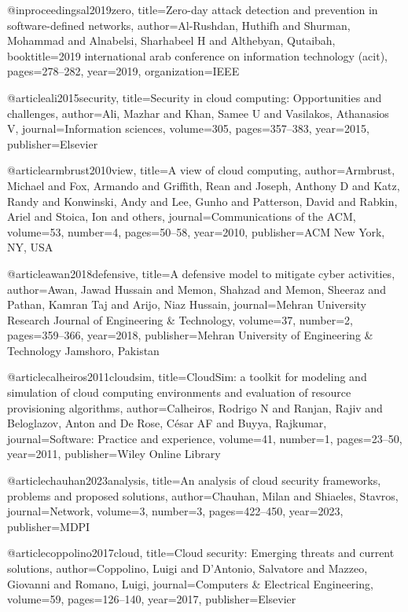@inproceedings{al2019zero,
title={Zero-day attack detection and prevention in software-defined networks},
author={Al-Rushdan, Huthifh and Shurman, Mohammad and Alnabelsi, Sharhabeel H and Althebyan, Qutaibah},
booktitle={2019 international arab conference on information technology (acit)},
pages={278--282},
year={2019},
organization={IEEE}
}

@article{ali2015security,
title={Security in cloud computing: Opportunities and challenges},
author={Ali, Mazhar and Khan, Samee U and Vasilakos, Athanasios V},
journal={Information sciences},
volume={305},
pages={357--383},
year={2015},
publisher={Elsevier}
}

@article{armbrust2010view,
title={A view of cloud computing},
author={Armbrust, Michael and Fox, Armando and Griffith, Rean and Joseph, Anthony D and Katz, Randy and Konwinski, Andy and Lee, Gunho and Patterson, David and Rabkin, Ariel and Stoica, Ion and others},
journal={Communications of the ACM},
volume={53},
number={4},
pages={50--58},
year={2010},
publisher={ACM New York, NY, USA}
}

@article{awan2018defensive,
title={A defensive model to mitigate cyber activities},
author={Awan, Jawad Hussain and Memon, Shahzad and Memon, Sheeraz and Pathan, Kamran Taj and Arijo, Niaz Hussain},
journal={Mehran University Research Journal of Engineering \& Technology},
volume={37},
number={2},
pages={359--366},
year={2018},
publisher={Mehran University of Engineering \& Technology Jamshoro, Pakistan}
}

@article{calheiros2011cloudsim,
title={CloudSim: a toolkit for modeling and simulation of cloud computing environments and evaluation of resource provisioning algorithms},
author={Calheiros, Rodrigo N and Ranjan, Rajiv and Beloglazov, Anton and De Rose, C{\'e}sar AF and Buyya, Rajkumar},
journal={Software: Practice and experience},
volume={41},
number={1},
pages={23--50},
year={2011},
publisher={Wiley Online Library}
}

@article{chauhan2023analysis,
title={An analysis of cloud security frameworks, problems and proposed solutions},
author={Chauhan, Milan and Shiaeles, Stavros},
journal={Network},
volume={3},
number={3},
pages={422--450},
year={2023},
publisher={MDPI}
}

@article{coppolino2017cloud,
title={Cloud security: Emerging threats and current solutions},
author={Coppolino, Luigi and D’Antonio, Salvatore and Mazzeo, Giovanni and Romano, Luigi},
journal={Computers \& Electrical Engineering},
volume={59},
pages={126--140},
year={2017},
publisher={Elsevier}
}

